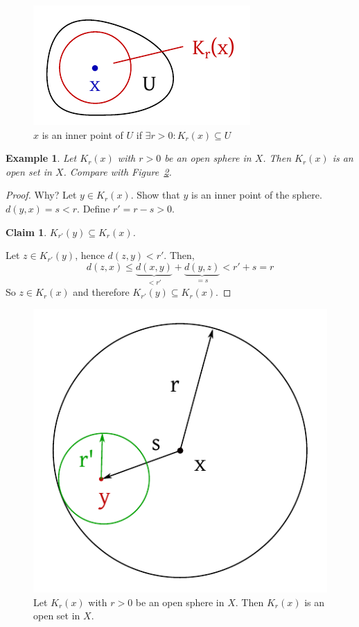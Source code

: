 \documentclass{article}
\newtheorem{example}{Example}  \numberwithin{example}{section}
\newtheorem*{claim}{Claim}%
\begin{document}
\begin{figure}[t]
  \begin{center}
    \includegraphics{img/04_inner_point.pdf}
    \caption{$x$ is an inner point of $U$ if $\exists r > 0: K_r(x) \subseteq U$}
    \label{img:inner}
  \end{center}
\end{figure}

\begin{example}
  Let $K_r(x)$ with $r > 0$ be an open sphere in $X$.
  Then $K_r(x)$ is an open set in $X$.
  Compare with Figure~\ref{img:opensp}.
\end{example}

\begin{proof}
  Why? Let $y \in K_r(x)$. Show that $y$ is an inner point of the sphere.
  $d(y,x) = s < r$. Define $r' = r - s > 0$.

  \begin{claim}
    $K_{r'}(y) \subseteq K_r(x)$.
  \end{claim}

  Let $z \in K_{r'}(y)$, hence $d(z, y) < r'$. Then,
  \[ d(z, x) \leq \underbrace{d(x, y)}_{< r'} + \underbrace{d(y, z)}_{= s} < r' + s = r \]
  So $z \in K_r(x)$ and therefore $K_{r'}(y) \subseteq K_r(x)$.
\end{proof}

\begin{figure}[t]
  \begin{center}
    \includegraphics{img/05_open_sphere.pdf}
    \caption{Let $K_r(x)$ with $r>0$ be an open sphere in $X$. Then $K_r(x)$ is an open set in $X$.}
    \label{img:opensp}
  \end{center}
\end{figure}
\end{document}
